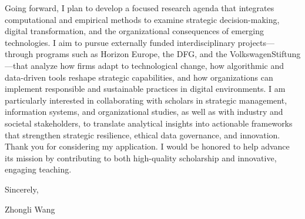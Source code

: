 \documentclass{nfr}
\begin{document}
Going forward, I plan to develop a focused research agenda that integrates computational and empirical methods to examine strategic decision-making, digital transformation, and the organizational consequences of emerging technologies. 
I aim to pursue externally funded interdisciplinary projects—through programs such as Horizon Europe, the DFG, and the VolkswagenStiftung—that analyze how firms adapt to technological change, how algorithmic and data-driven tools reshape strategic capabilities, and how organizations can implement responsible and sustainable practices in digital environments. 
I am particularly interested in collaborating with scholars in strategic management, information systems, and organizational studies, as well as with industry and societal stakeholders, to translate analytical insights into actionable frameworks that strengthen strategic resilience, ethical data governance, and innovation. \\

Thank you for considering my application. 
I would be honored to help advance its mission by contributing to both high-quality scholarship and innovative, engaging teaching.\\
\vspace{5mm}

\noindent Sincerely,\\
\vspace{5mm}

\noindent Zhongli Wang

\vspace{5mm}

\end{document}
